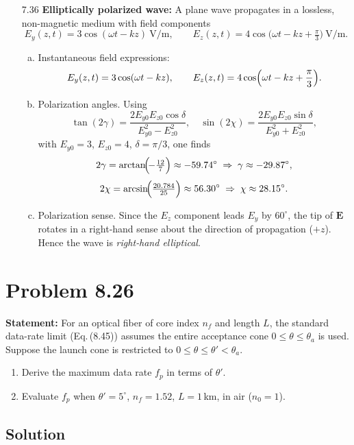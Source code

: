 \begin{itemize}
  \item[7.36] \textbf{Elliptically polarized wave:} A plane wave propagates in a lossless, non-magnetic medium with field components
  \[
    E_y(z,t)=3\cos(\omega t -kz)\ \mathrm{V/m},\qquad
    E_z(z,t)=4\cos\bigl(\omega t -kz + \tfrac{\pi}{3}\bigr)\ \mathrm{V/m}.
  \]
  \begin{enumerate}[(a)]
    \item Instantaneous field expressions:
    \[
      E_y(z,t)=3\cos(\omega t -kz),\qquad
      E_z(z,t)=4\cos\Bigl(\omega t -kz + \frac{\pi}{3}\Bigr).
    \]
    \item Polarization angles.  Using
    \[
      \tan(2\gamma)
        =\frac{2E_{y0}E_{z0}\cos\delta}{E_{y0}^2 - E_{z0}^2},
      \quad
      \sin(2\chi)
        =\frac{2E_{y0}E_{z0}\sin\delta}{E_{y0}^2 + E_{z0}^2},
    \]
    with \(E_{y0}=3\), \(E_{z0}=4\), \(\delta=\pi/3\), one finds
    \[
      2\gamma=\arctan\!\Bigl(\!-\tfrac{12}{7}\Bigr)\approx -59.74^\circ
      \;\Rightarrow\;
      \gamma\approx -29.87^\circ,
    \]
    \[
      2\chi=\arcsin\!\Bigl(\tfrac{20.784}{25}\Bigr)\approx56.30^\circ
      \;\Rightarrow\;
      \chi\approx28.15^\circ.
    \]
    \item Polarization sense.  Since the \(E_z\) component leads \(E_y\) by \(60^\circ\), the tip of \(\mathbf E\) rotates in a right‐hand sense about the direction of propagation (\(+z\)).  Hence the wave is \emph{right‐hand elliptical}.
  \end{enumerate}
\end{itemize}


\section*{Problem 8.26}
\textbf{Statement:} For an optical fiber of core index $n_f$ and length $L$, the standard data-rate limit (Eq.\,(8.45)) assumes the entire acceptance cone $0\le\theta\le\theta_a$ is used. Suppose the launch cone is restricted to $0\le\theta\le\theta'<\theta_a$.  
\begin{enumerate}
  \item Derive the maximum data rate $f_p$ in terms of $\theta'$.
  \item Evaluate $f_p$ when $\theta'=5^\circ$, $n_f=1.52$, $L=1\,$km, in air ($n_0=1$).
\end{enumerate}

\subsection*{Solution}
